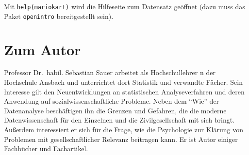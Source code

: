 \documentclass[
  letterpaper,
  twoside,
  open=any]{scrbook}
\theoremstyle{definition}
\theoremstyle{definition}
\theoremstyle{definition}
\theoremstyle{remark}
\begin{document}
Mit \texttt{help(mariokart)} wird die Hilfeseite zum Datensatz geöffnet
(dazu muss das Paket \texttt{openintro} bereitgestellt sein).

\chapter{Zum Autor}\label{zum-autor}

Professor Dr.~habil. Sebastian Sauer arbeitet als Hochschullehrer n der
Hochschule Ansbach und unterrichtet dort Statistik und verwandte Fächer.
Sein Interesse gilt den Neuentwicklungen an statistischen
Analyseverfahren und deren Anwendung auf sozialwissenschaftliche
Probleme. Neben dem \enquote{Wie} der Datenanalyse beschäftigen ihn die
Grenzen und Gefahren, die die moderne Datenwissenschaft für den
Einzelnen und die Zivilgesellschaft mit sich bringt. Außerdem
interessiert er sich für die Frage, wie die Psychologie zur Klärung von
Problemen mit gesellschaftlicher Relevanz beitragen kann. Er ist Autor
einiger Fachbücher und Fachartikel.


\backmatter
\end{document}
